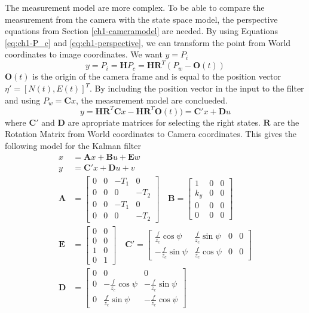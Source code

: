 	The measurement model are more complex. To be able to compare the measurement from the camera with the
	state space model, the perspective equations from Section \ref{ch1-cameramodel} are needed. By using
	Equations \eqref{eq:ch1-P_c} and \eqref{eq:ch1-perspective}, we can transform the point from World
	coordinates to image coordinates. We want $y = P_i$
	\begin{equation*}
		y = P_i = \mathbf{H} P_c = \mathbf{H R}^T ( P_w - \mathbf{O}(t))
	\end{equation*}
	$\mathbf{O}(t)$ is the origin of the camera frame and is equal to the position vector $\eta' = [N(t),
	E(t)]^T$. By including the position vector in the input to the filter and using 
	$P_w = \mathbf{C} x$, the measurement model are conclueded.
	\begin{equation}
		\label{eq:ch2-measurement}
		y = \mathbf{H R}^T \mathbf{C} x - \mathbf{H R}^T  \mathbf{O}(t)) = \mathbf{C}'x + \mathbf{D} u
	\end{equation}
	where $\mathbf{C'}$ and $\mathbf{D}$ are apropriate matrices for selecting the right states. $\mathbf{R}$
	are the Rotation Matrix from World coordinates to Camera coordinates. This gives the following model
	for the Kalman filter
	\begin{align}
		x &= \mathbf{A} x + \mathbf{B} u + \mathbf{E} w\\
		y &= \mathbf{C}'x + \mathbf{D} u + v\\
		\mathbf{A} &= \left [ \begin{matrix}
					0 & 0 & -T_1 & 0 \\
					0 & 0 & 0 & -T_2 \\
					0 & 0 & -T_1 & 0 \\
					0 & 0 & 0 & -T_2 
					\end{matrix} \right] \quad \mathbf{B} = \left[ \begin{matrix}
										1 & 0 & 0 \\
										k_y & 0 & 0\\
										0   & 0 & 0 \\
										0 & 0 & 0
										\end{matrix} \right]\\
		\mathbf{E} &= \left [ \begin{matrix}
					0 & 0 \\
					0 & 0 \\
					1 & 0 \\
					0 & 1
					\end{matrix} \right] \quad \mathbf{C}' = \left [ \begin{matrix}
						\frac{f}{z_c} \cos{\psi} &\frac{f}{z_c} \sin{\psi} & 0 & 0 \\
						-\frac{f}{z_c} \sin{\psi}& \frac{f}{z_c} \cos{\psi} & 0 & 0 
								\end{matrix} \right] \\
		\mathbf{D} &= \left [ \begin{matrix}
					0 & 0 & 0\\
					0 & -\frac{f}{z_c} \cos{\psi} & -\frac{f}{z_c} \sin{\psi} \\
					0 & \frac{f}{z_c} \sin{\psi} & -\frac{f}{z_c} \cos{\psi}
					\end{matrix} \right]
	\end{align}
